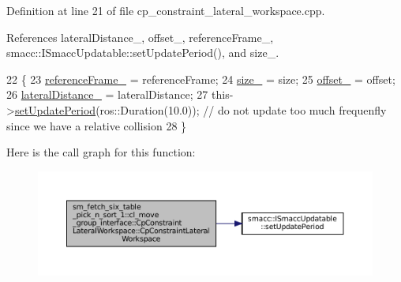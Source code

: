 Definition at line 21 of file cp\+\_\+constraint\+\_\+lateral\+\_\+workspace.\+cpp.



References lateral\+Distance\+\_\+, offset\+\_\+, reference\+Frame\+\_\+, smacc\+::\+I\+Smacc\+Updatable\+::set\+Update\+Period(), and size\+\_\+.


\begin{DoxyCode}
22         \{
23             \hyperlink{classsm__fetch__six__table__pick__n__sort__1_1_1cl__move__group__interface_1_1CpConstraintLateralWorkspace_aa736818af32861dede32b3d3165bb72c}{referenceFrame\_} = referenceFrame;
24             \hyperlink{classsm__fetch__six__table__pick__n__sort__1_1_1cl__move__group__interface_1_1CpConstraintLateralWorkspace_a31750f9209a83e0abab106676f13b577}{size\_} = size;
25             \hyperlink{classsm__fetch__six__table__pick__n__sort__1_1_1cl__move__group__interface_1_1CpConstraintLateralWorkspace_aadcbc7ce532648f746b44140af17d36a}{offset\_} = offset;
26             \hyperlink{classsm__fetch__six__table__pick__n__sort__1_1_1cl__move__group__interface_1_1CpConstraintLateralWorkspace_a368d7033825c5a8d678d98fb412d5c0a}{lateralDistance\_} = lateralDistance;
27             this->\hyperlink{classsmacc_1_1ISmaccUpdatable_a88f3b092a81b2d8810a9776c8c69855b}{setUpdatePeriod}(ros::Duration(10.0)); \textcolor{comment}{// do not update too much frequenfly
       since we have a relative collision}
28         \}
\end{DoxyCode}
Here is the call graph for this function\+:
\nopagebreak
\begin{figure}[H]
\begin{center}
\leavevmode
\includegraphics[width=350pt]{classsm__fetch__six__table__pick__n__sort__1_1_1cl__move__group__interface_1_1CpConstraintLateralWorkspace_aa952c8d68d39f96f8f31ec8d59410eb8_cgraph}
\end{center}
\end{figure}



